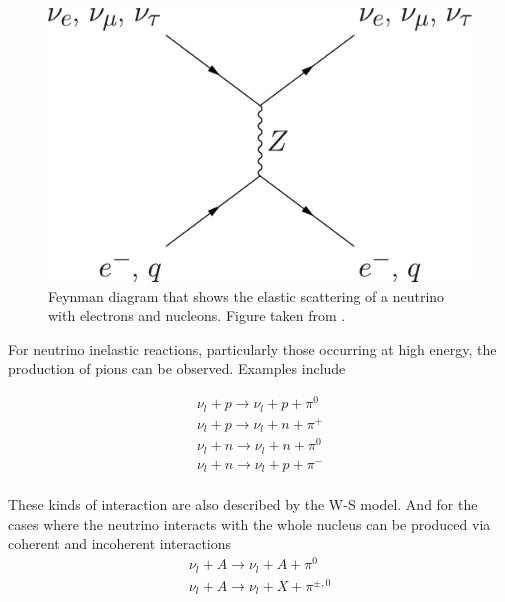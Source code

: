 \begin{figure}[!htb]
    \centering
    \includegraphics[scale=0.2]{Figures/Chapter1/neutral-current.png}
    \caption{Feynman diagram that shows the elastic scattering of a neutrino with electrons and nucleons. Figure taken from \cite{NCImage}.}
    \label{fig:NeutrinoInt:NC}
\end{figure}

For neutrino inelastic reactions, particularly those occurring at high energy, the production of pions can be observed. Examples include

\begin{equation}
    \begin{split}
        \nu_l + p \rightarrow \nu_l + p +\pi^0 \\
        \nu_l + p \rightarrow \nu_l + n +\pi^+ \\
        \nu_l + n \rightarrow \nu_l + n +\pi^0 \\
        \nu_l + n \rightarrow \nu_l + p +\pi^- \\
    \end{split}
\end{equation}

These kinds of interaction are also described by the W-S model. And for the cases where the neutrino interacts with the whole nucleus can be produced via coherent and incoherent interactions
\begin{equation}
    \begin{split}
        \nu_l + A \rightarrow \nu_l + A +\pi^0 \\
        \nu_l + A \rightarrow \nu_l + X +\pi^{\pm,0} \\
    \end{split}
\end{equation}

